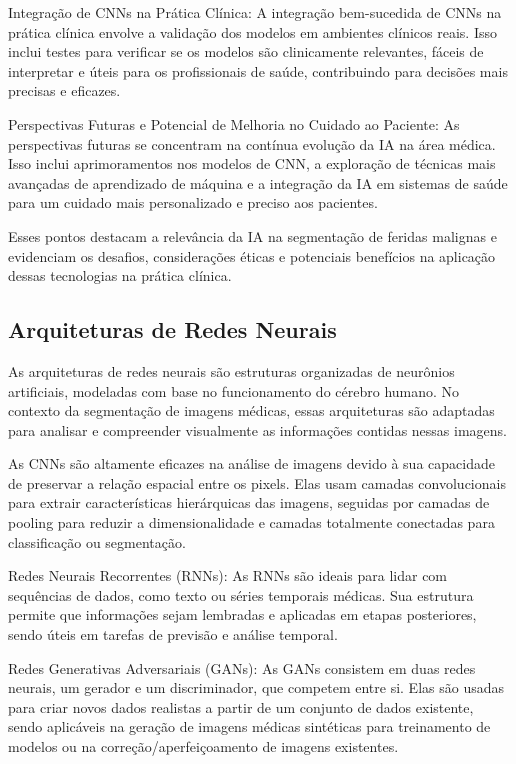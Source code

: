 Integração de \ac{CNNs} na Prática Clínica: A integração bem-sucedida de \ac{CNNs} na prática clínica envolve a validação dos modelos em ambientes clínicos reais. Isso inclui testes para verificar se os modelos são clinicamente relevantes, fáceis de interpretar e úteis para os profissionais de saúde, contribuindo para decisões mais precisas e eficazes.

Perspectivas Futuras e Potencial de Melhoria no Cuidado ao Paciente: As perspectivas futuras se concentram na contínua evolução da IA na área médica. Isso inclui aprimoramentos nos modelos de \ac{CNN}, a exploração de técnicas mais avançadas de aprendizado de máquina e a integração da IA em sistemas de saúde para um cuidado mais personalizado e preciso aos pacientes.

Esses pontos destacam a relevância da IA na segmentação de feridas malignas e evidenciam os desafios, considerações éticas e potenciais benefícios na aplicação dessas tecnologias na prática clínica.

\subsection{Arquiteturas de Redes Neurais}

As arquiteturas de redes neurais são estruturas organizadas de neurônios artificiais, modeladas com base no funcionamento do cérebro humano. No contexto da segmentação de imagens médicas, essas arquiteturas são adaptadas para analisar e compreender visualmente as informações contidas nessas imagens.

As \ac{CNNs} são altamente eficazes na análise de imagens devido à sua capacidade de preservar a relação espacial entre os pixels. Elas usam camadas convolucionais para extrair características hierárquicas das imagens, seguidas por camadas de pooling para reduzir a dimensionalidade e camadas totalmente conectadas para classificação ou segmentação.

Redes Neurais Recorrentes (RNNs): As RNNs são ideais para lidar com sequências de dados, como texto ou séries temporais médicas. Sua estrutura permite que informações sejam lembradas e aplicadas em etapas posteriores, sendo úteis em tarefas de previsão e análise temporal.

Redes Generativas Adversariais (GANs): As GANs consistem em duas redes neurais, um gerador e um discriminador, que competem entre si. Elas são usadas para criar novos dados realistas a partir de um conjunto de dados existente, sendo aplicáveis na geração de imagens médicas sintéticas para treinamento de modelos ou na correção/aperfeiçoamento de imagens existentes.


